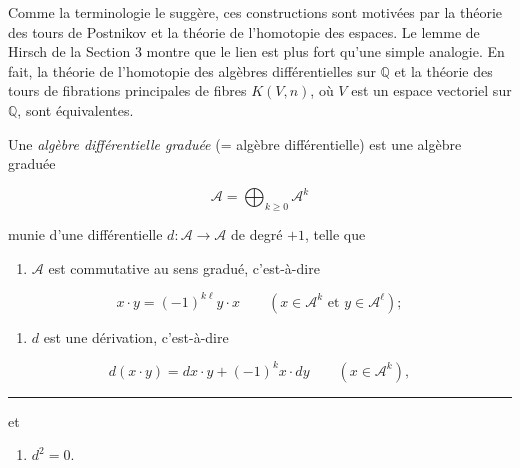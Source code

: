 \documentclass[
  french,
  a3paper,
  a3paper]{extarticle}
\providecommand{\tightlist}{%
  \setlength{\itemsep}{0pt}\setlength{\parskip}{0pt}}
\begin{document}
Comme la terminologie le suggère, ces constructions sont motivées par la
théorie des tours de Postnikov et la théorie de l'homotopie des espaces.
Le lemme de Hirsch de la Section 3 montre que le lien est plus fort
qu'une simple analogie. En fait, la théorie de l'homotopie des algèbres
différentielles sur \(\mathbb Q\) et la théorie des tours de fibrations
principales de fibres \(K(V,n)\), où \(V\) est un espace vectoriel sur
\(\mathbb Q\), sont équivalentes.

Une \emph{algèbre différentielle graduée} (= algèbre différentielle) est
une algèbre graduée

\[
\mathscr A=\bigoplus_{k\ge0}\mathscr A^k
\]

munie d'une différentielle \(d:\mathscr A\to\mathscr A\) de degré
\(+1\), telle que

\begin{enumerate}
\def\labelenumi{\arabic{enumi})}
\tightlist
\item
  \(\mathscr A\) est commutative au sens gradué, c'est-à-dire
\end{enumerate}

\[
x\cdot y=(-1)^{k\ell}y\cdot x\qquad(x\in\mathscr A^k\text{ et }y\in\mathscr A^\ell) ;
\]

\begin{enumerate}
\def\labelenumi{\arabic{enumi})}
\setcounter{enumi}{1}
\tightlist
\item
  \(d\) est une dérivation, c'est-à-dire
\end{enumerate}

\[
d(x\cdot y)=dx\cdot y+(-1)^k x\cdot dy\qquad(x\in\mathscr A^k),
\]

\clearpage



\par

\vspace{0.7mm}\hrule\vspace{1.6mm}

\fontsize{9}{11}\selectfont

et

\begin{enumerate}
\def\labelenumi{\arabic{enumi})}
\setcounter{enumi}{2}
\tightlist
\item
  \(d^2=0\).
\end{enumerate}
\end{document}
